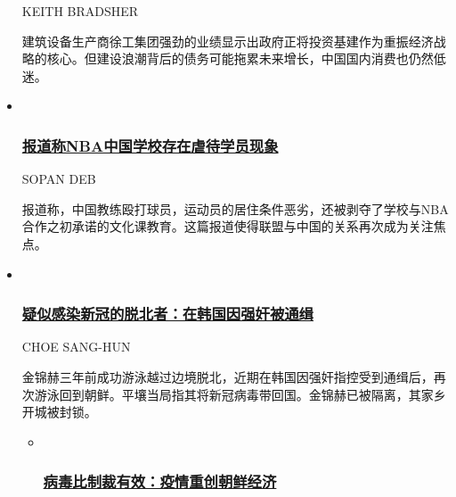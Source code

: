 \begin{itemize}
  KEITH BRADSHER

  \href{/business/20200730/china-economy-infrastructure/}{}

  建筑设备生产商徐工集团强劲的业绩显示出政府正将投资基建作为重振经济战略的核心。但建设浪潮背后的债务可能拖累未来增长，中国国内消费也仍然低迷。
\item ~
  \hypertarget{ux62a5ux9053ux79f0nbaux4e2dux56fdux5b66ux6821ux5b58ux5728ux8650ux5f85ux5b66ux5458ux73b0ux8c61}{%
  \subsubsection{\texorpdfstring{\href{/sports/20200730/nba-china-abuse/}{报道称NBA中国学校存在虐待学员现象}}{报道称NBA中国学校存在虐待学员现象}}\label{ux62a5ux9053ux79f0nbaux4e2dux56fdux5b66ux6821ux5b58ux5728ux8650ux5f85ux5b66ux5458ux73b0ux8c61}}

  SOPAN DEB

  \href{/sports/20200730/nba-china-abuse/}{}

  报道称，中国教练殴打球员，运动员的居住条件恶劣，还被剥夺了学校与NBA合作之初承诺的文化课教育。这篇报道使得联盟与中国的关系再次成为关注焦点。
\item ~
  \hypertarget{ux7591ux4f3cux611fux67d3ux65b0ux51a0ux7684ux8131ux5317ux8005ux5728ux97e9ux56fdux56e0ux5f3aux5978ux88abux901aux7f09}{%
  \subsubsection{\texorpdfstring{\href{/asia-pacific/20200729/north-korea-defector-coronavirus/}{疑似感染新冠的脱北者：在韩国因强奸被通缉}}{疑似感染新冠的脱北者：在韩国因强奸被通缉}}\label{ux7591ux4f3cux611fux67d3ux65b0ux51a0ux7684ux8131ux5317ux8005ux5728ux97e9ux56fdux56e0ux5f3aux5978ux88abux901aux7f09}}

  CHOE SANG-HUN

  \href{/asia-pacific/20200729/north-korea-defector-coronavirus/}{}

  金锦赫三年前成功游泳越过边境脱北，近期在韩国因强奸指控受到通缉后，再次游泳回到朝鲜。平壤当局指其将新冠病毒带回国。金锦赫已被隔离，其家乡开城被封锁。

  \begin{itemize}
  \item ~
    \hypertarget{ux75c5ux6bd2ux6bd4ux5236ux88c1ux6709ux6548ux75abux60c5ux91cdux521bux671dux9c9cux7ecfux6d4e}{%
    \subsubsection{\texorpdfstring{\href{/asia-pacific/20200706/north-korea-sanctions-coronavirus/}{病毒比制裁有效：疫情重创朝鲜经济}}{病毒比制裁有效：疫情重创朝鲜经济}}\label{ux75c5ux6bd2ux6bd4ux5236ux88c1ux6709ux6548ux75abux60c5ux91cdux521bux671dux9c9cux7ecfux6d4e}}
  \end{itemize}
\end{itemize}

